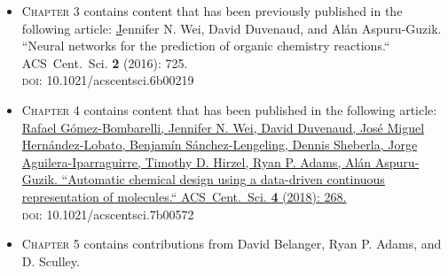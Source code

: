 
\noindent \begin{itemize} \setlength\itemsep{1em}
\item[] \textsc{Chapter 3} contains content that has been previously published in the following article:
\href{https://doi.org/10.1021/acscentsci.6b00219}
Jennifer N. Wei, David Duvenaud, and Al\'an Aspuru-Guzik. ``Neural networks for the prediction of organic chemistry reactions.`` \mbox{ACS Cent. Sci.} \textbf{2} (2016): 725.
\\\textsc{doi}: 10.1021/acscentsci.6b00219 

\item[]  \textsc{Chapter 4} contains content that has been published in the following article: 
\href{https://doi.org/10.1021/acscentsci.7b00572}
{Rafael G\'omez-Bombarelli, Jennifer N. Wei, David Duvenaud, Jos\'e Miguel Hern\'andez-Lobato, Benjam\'in S\'anchez-Lengeling, Dennis Sheberla, Jorge Aguilera-Iparraguirre, Timothy D. Hirzel, Ryan P. Adams, Al\'an Aspuru-Guzik. ``Automatic chemical design using a data-driven continuous representation of molecules.`` \mbox{ACS Cent. Sci.} \textbf{4} (2018): 268.} 
\\\textsc{doi}: 10.1021/acscentsci.7b00572 

\item[] \textsc{Chapter 5} contains contributions from David Belanger, Ryan P. Adams, and D. Sculley. 
\end{itemize}

\doublespacing

